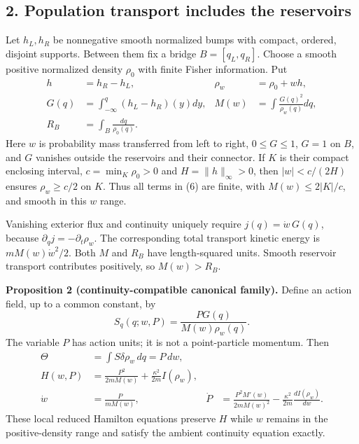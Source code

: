 \documentclass[11pt,a4paper]{article}
\begin{document}
\hypertarget{population-transport-includes-the-reservoirs}{%
\subsection{2. Population transport includes the
reservoirs}\label{population-transport-includes-the-reservoirs}}

Let \(h_L,h_R\) be nonnegative smooth normalized bumps with compact,
ordered, disjoint supports. Between them fix a bridge \(B=[q_L,q_R]\).
Choose a smooth positive normalized density \(\rho_0\) with finite
Fisher information. Put \[\begin{aligned}
h&=h_R-h_L,&\rho_w&=\rho_0+wh,\\
G(q)&=\int_{-\infty}^{q}(h_L-h_R)(y)dy,&
M(w)&=\int\frac{G(q)^2}{\rho_w(q)}dq,\\
R_B&=\int_B\frac{dq}{\rho_0(q)}.&&
\end{aligned}\tag{6}\] Here \(w\) is probability mass transferred from
left to right, \(0\le G\le1\), \(G=1\) on \(B\), and \(G\) vanishes
outside the reservoirs and their connector. If \(K\) is their compact
enclosing interval, \(c=\min_K\rho_0>0\) and \(H=\|h\|_\infty>0\), then
\(|w|<c/(2H)\) ensures \(\rho_w\ge c/2\) on \(K\). Thus all terms in (6)
are finite, with \(M(w)\le2|K|/c\), and smooth in this \(w\) range.

Vanishing exterior flux and continuity uniquely require
\(j(q)=\dot w\,G(q)\), because \(\partial_qj=-\partial_t\rho_w\). The
corresponding total transport kinetic energy is \(mM(w)\dot w^2/2\).
Both \(M\) and \(R_B\) have length-squared units. Smooth reservoir
transport contributes positively, so \(M(w)>R_B\).

\textbf{Proposition 2 (continuity-compatible canonical family).} Define
an action field, up to a common constant, by
\[S_q(q;w,P)=\frac{P G(q)}{M(w)\rho_w(q)}.\tag{7}\] The variable \(P\)
has action units; it is not a point-particle momentum. Then
\[\begin{aligned}
\Theta&=\int S\delta\rho_w\,dq=P\,dw,\\
H(w,P)&=\frac{P^2}{2mM(w)}+\frac{\kappa^2}{2m}I(\rho_w),\\
\dot w&=\frac{P}{mM(w)},&
\dot P&=\frac{P^2M'(w)}{2mM(w)^2}
       -\frac{\kappa^2}{2m}\frac{dI(\rho_w)}{dw}.
\end{aligned}\tag{8}\] These local reduced Hamilton equations preserve
\(H\) while \(w\) remains in the positive-density range and satisfy the
ambient continuity equation exactly.
\end{document}
